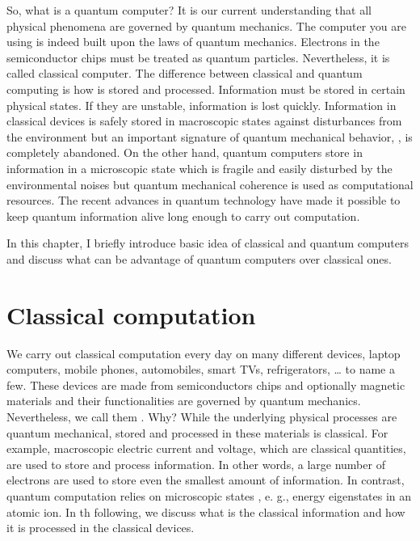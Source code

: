 \documentclass[letterpaper,10pt,english]{jupyterBook}
\begin{document}
\sphinxAtStartPar
So, what is a quantum computer?  It is our current understanding that all physical phenomena are governed by quantum mechanics. The computer you are using is indeed built upon the laws of quantum mechanics. Electrons in the semiconductor chips must be treated as quantum particles.  Nevertheless, it is called classical computer.  The difference between classical and quantum computing is how  is stored and processed.  Information must be stored in certain  physical states.  If they are unstable, information is lost quickly.  Information in classical devices is safely stored in  macroscopic states against disturbances from the environment but an important signature of quantum mechanical behavior, , is completely abandoned.  On the other hand, quantum computers store in information in a microscopic state which is fragile and easily disturbed by the environmental noises but quantum mechanical coherence is used as computational resources.  The recent advances in quantum technology have made it possible to keep quantum information alive long enough to carry out computation.

\sphinxAtStartPar
In this chapter, I  briefly introduce basic idea of classical and quantum computers and discuss what can be advantage of quantum computers over classical ones.

\sphinxstepscope


\section{Classical computation}
\label{\detokenize{computation/ccomp:classical-computation}}\label{\detokenize{computation/ccomp:sec-ccomp}}\label{\detokenize{computation/ccomp::doc}}
\sphinxAtStartPar
We carry out classical computation every day on many different devices, laptop computers, mobile phones, automobiles, smart TVs, refrigerators, …  to name a few. These devices are made from semiconductors chips and optionally magnetic materials and their functionalities are governed by quantum mechanics.  Nevertheless, we call them . Why?   While the underlying physical processes are quantum mechanical,  stored and processed in these materials is classical.  For example,  macroscopic electric current and voltage, which are classical quantities, are used to store and process information.  In other words, a large number of electrons are used to store even the smallest amount of information.  In contrast, quantum computation relies on microscopic states , e. g.,  energy eigenstates in an atomic ion.  In th following, we discuss what is the classical information and how it is processed in the classical devices.
\end{document}
